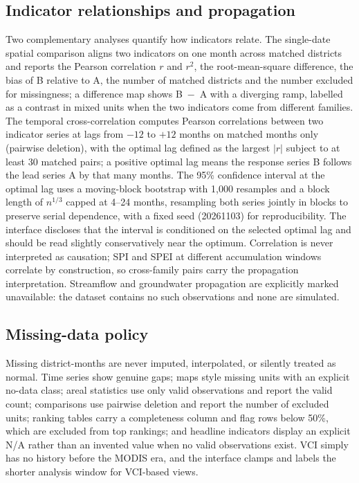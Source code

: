 \documentclass[10pt,a4paper]{article}
\begin{document}
\subsection*{Indicator relationships and propagation}
Two complementary analyses quantify how indicators relate. The single-date spatial comparison aligns two indicators on one month across matched districts and reports the Pearson correlation $r$ and $r^2$, the root-mean-square difference, the bias of B relative to A, the number of matched districts and the number excluded for missingness; a difference map shows B~$-$~A with a diverging ramp, labelled as a contrast in mixed units when the two indicators come from different families. The temporal cross-correlation computes Pearson correlations between two indicator series at lags from $-12$ to $+12$ months on matched months only (pairwise deletion), with the optimal lag defined as the largest $|r|$ subject to at least 30 matched pairs; a positive optimal lag means the response series B follows the lead series A by that many months. The 95\% confidence interval at the optimal lag uses a moving-block bootstrap\citep{Kunsch1989} with 1{,}000 resamples and a block length of $n^{1/3}$ capped at 4--24 months, resampling both series jointly in blocks to preserve serial dependence, with a fixed seed (20261103) for reproducibility. The interface discloses that the interval is conditioned on the selected optimal lag and should be read slightly conservatively near the optimum. Correlation is never interpreted as causation; SPI and SPEI at different accumulation windows correlate by construction, so cross-family pairs carry the propagation interpretation. Streamflow and groundwater propagation are explicitly marked unavailable: the dataset contains no such observations and none are simulated.

\subsection*{Missing-data policy}
Missing district-months are never imputed, interpolated, or silently treated as normal. Time series show genuine gaps; maps style missing units with an explicit no-data class; areal statistics use only valid observations and report the valid count; comparisons use pairwise deletion and report the number of excluded units; ranking tables carry a completeness column and flag rows below 50\%, which are excluded from top rankings; and headline indicators display an explicit N/A rather than an invented value when no valid observations exist. VCI simply has no history before the MODIS era, and the interface clamps and labels the shorter analysis window for VCI-based views.
\end{document}
